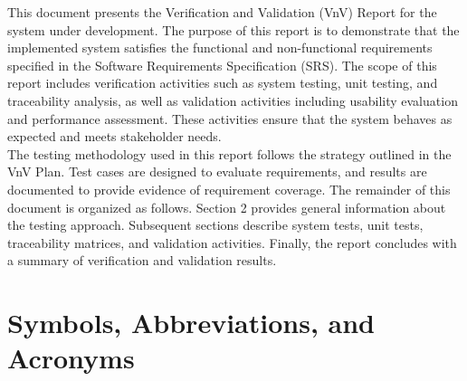 \documentclass[12pt, titlepage]{article}
\begin{document}
This document presents the Verification and Validation (VnV) Report for the
system under development. The purpose of this report is to demonstrate that
the implemented system satisfies the functional and non-functional
requirements specified in the Software Requirements Specification (SRS).
The scope of this report includes verification activities such as system
testing, unit testing, and traceability analysis, as well as validation
activities including usability evaluation and performance assessment. These
activities ensure that the system behaves as expected and meets stakeholder
needs.\\

The testing methodology used in this report follows the strategy outlined in
the VnV Plan. Test cases are designed to evaluate requirements, and results
are documented to provide evidence of requirement coverage. The
remainder of this document is organized as follows. Section 2 provides
general information about the testing approach. Subsequent sections describe
system tests, unit tests, traceability matrices, and validation activities.
Finally, the report concludes with a summary of verification and validation
results.

\section{Symbols, Abbreviations, and Acronyms}
\end{document}
